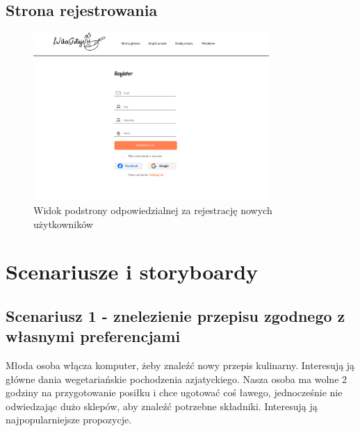 \documentclass{article}
\begin{document}
\subsection{Strona rejestrowania}

\begin{figure}[H]
    \begin{center}
        \includegraphics[width=0.8\textwidth]{mockups/register_page}
    \end{center}
    \caption{Widok podstrony odpowiedzialnej za rejestrację nowych użytkowników}
\end{figure}

\section{Scenariusze i storyboardy}
\subsection{Scenariusz 1 - znelezienie przepisu zgodnego z własnymi preferencjami}

Młoda osoba włącza komputer, żeby znaleźć nowy przepis kulinarny. Interesują ją główne dania wegetariańskie pochodzenia azjatyckiego. Nasza osoba ma wolne 2 godziny na przygotowanie 
posiłku i chce ugotować coś ławego, jednocześnie nie odwiedzając dużo sklepów, aby znaleźć potrzebne składniki. Interesują ją najpopularniejsze propozycje.
\end{document}
